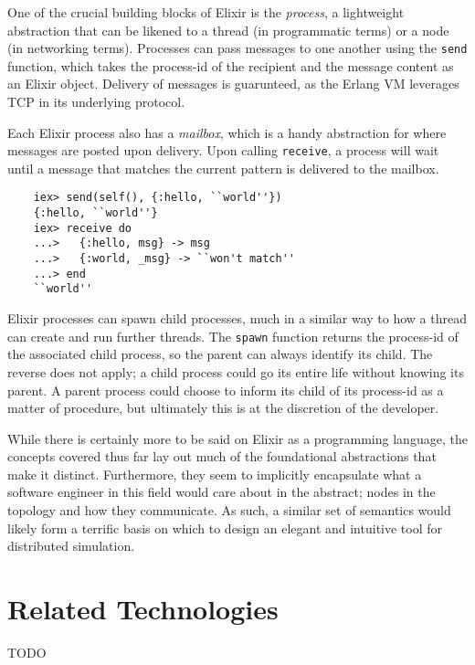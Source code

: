 One of the crucial building blocks of Elixir is the \emph{process}, a lightweight abstraction that can be likened to
a thread (in programmatic terms) or a node (in networking terms)\cite{elixir_processes}. Processes can pass messages
to one another using the \texttt{send} function, which takes the process-id of the recipient and the message content as
an Elixir object. Delivery of messages is guarunteed, as the Erlang VM leverages TCP in its underlying
protocol\cite{erlang_protocol}.

Each Elixir process also has a \emph{mailbox}, which is a handy abstraction for where messages are posted upon
delivery. Upon calling \texttt{receive}, a process will wait until a message that matches the current pattern is
delivered to the mailbox.

\begin{lstlisting}
    iex> send(self(), {:hello, ``world''})
    {:hello, ``world''}
    iex> receive do
    ...>   {:hello, msg} -> msg
    ...>   {:world, _msg} -> ``won't match''
    ...> end
    ``world''
\end{lstlisting}

Elixir processes can spawn child processes, much in a similar way to how a thread can create and run further threads.
The \texttt{spawn} function returns the process-id of the associated child process, so the parent can always identify
its child. The reverse does not apply; a child process could go its entire life without knowing its parent. A parent
process could choose to inform its child of its process-id as a matter of procedure, but ultimately this is at the
discretion of the developer.

While there is certainly more to be said on Elixir as a programming language, the concepts covered thus far lay out
much of the foundational abstractions that make it distinct. Furthermore, they seem to implicitly encapsulate what a
software engineer in this field would care about in the abstract; nodes in the topology and how they communicate.
As such, a similar set of semantics would likely form a terrific basis on which to design an elegant and intuitive
tool for distributed simulation.


\section{Related Technologies}

TODO
